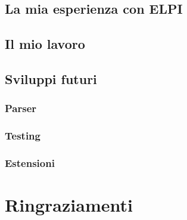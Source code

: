 \documentclass[12pt,a4paper,openright,twoside]{report}
\begin{document}
\section{La mia esperienza con ELPI}

\section{Il mio lavoro}

\section{Sviluppi futuri}
\subsection{Parser}
\subsection{Testing}
\subsection{Estensioni}







\clearpage{\pagestyle{empty}\cleardoublepage}	%


\chapter*{Ringraziamenti}

\thispagestyle{empty}

\end{document}
